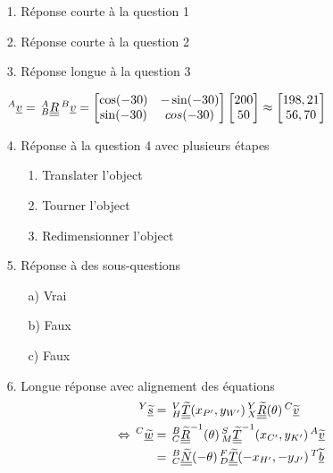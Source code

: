 \documentclass{gif7001}
\begin{document}
\vcourt

\begin{enumerate}
    \item[1.] Réponse courte à la question 1
    \item[2.] Réponse courte à la question 2
    \item[3.] Réponse longue à la question 3
    
    $^A\vvec{v} = \vrep[B]{A}\vmat{R} \vrep{B}\vvec{v} = \begin{bmatrix} \cos(-30) & -\sin(-30) \\ \sin(-30) & cos(-30) \end{bmatrix} \begin{bmatrix} 200 \\ 50 \end{bmatrix} \approx \begin{bmatrix} 198,21 \\ 56,70 \end{bmatrix}$
    \item[4.] Réponse à la question 4 avec plusieurs étapes
    \begin{enumerate}
        \item[1.] Translater l'object
        \item[2.] Tourner l'object
        \item[3.] Redimensionner l'object
    \end{enumerate}
    \item[5.] Réponse à des sous-questions
    \begin{enumerate}
        \item[a)] Vrai
        \item[b)] Faux
        \item[c)] Faux
    \end{enumerate}
    \item[6.] Longue réponse avec alignement des équations
    \begin{align*}
        \vrep{Y}\vvech{s} &= \vrep[H]{V}\vmath{T}(x_{P'},y_{W'}) \vrep[X]{Y}\vmath{R}(\theta) \vrep{C}\vvech{v} \\
        \Leftrightarrow \vrep{C}\vvech{w} &= \vrep[C]{B}\vmath{R}^{-1}(\theta) \vrep[M]{S}\vmath{T}^{-1}(x_{C'},y_{K'}) \vrep{A}\vvech{v} \\
        &= \vrep[C]{B}\vmath{N}(-\theta) \vrep[D]{F}\vmath{T}(-x_{H'},-y_{J'}) \vrep{T}\vvech{b} \\

\end{align*}
\end{enumerate}
\end{document}

